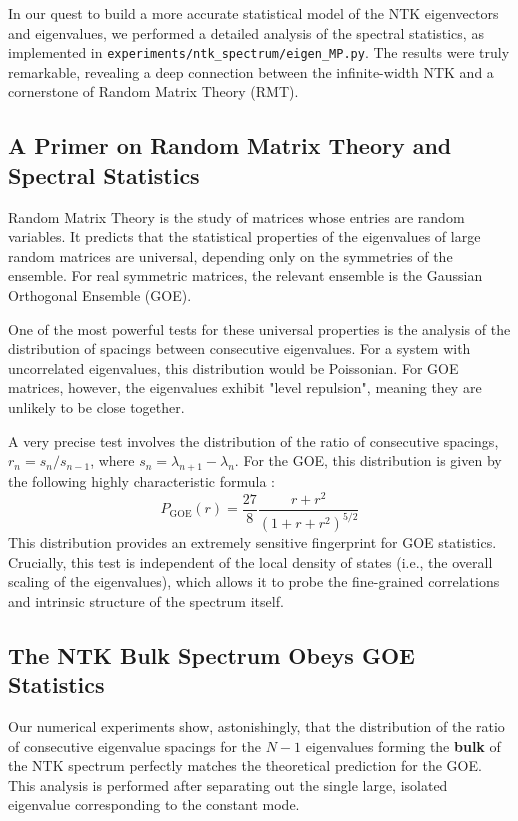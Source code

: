 \documentclass{article}
\begin{document}
In our quest to build a more accurate statistical model of the NTK eigenvectors and eigenvalues, we performed a detailed analysis of the spectral statistics, as implemented in \verb|experiments/ntk_spectrum/eigen_MP.py|. The results were truly remarkable, revealing a deep connection between the infinite-width NTK and a cornerstone of Random Matrix Theory (RMT).

\subsection{A Primer on Random Matrix Theory and Spectral Statistics}
Random Matrix Theory is the study of matrices whose entries are random variables. It predicts that the statistical properties of the eigenvalues of large random matrices are universal, depending only on the symmetries of the ensemble. For real symmetric matrices, the relevant ensemble is the Gaussian Orthogonal Ensemble (GOE).

One of the most powerful tests for these universal properties is the analysis of the distribution of spacings between consecutive eigenvalues. For a system with uncorrelated eigenvalues, this distribution would be Poissonian. For GOE matrices, however, the eigenvalues exhibit "level repulsion", meaning they are unlikely to be close together.

A very precise test involves the distribution of the ratio of consecutive spacings, $r_n = s_n / s_{n-1}$, where $s_n = \lambda_{n+1} - \lambda_n$. For the GOE, this distribution is given by the following highly characteristic formula \cite{atas2013distribution}:
\begin{equation}
P_{\text{GOE}}(r) = \frac{27}{8} \frac{r + r^2}{(1 + r + r^2)^{5/2}}
\label{eq:goe_ratio_dist}
\end{equation}
This distribution provides an extremely sensitive fingerprint for GOE statistics. Crucially, this test is independent of the local density of states (i.e., the overall scaling of the eigenvalues), which allows it to probe the fine-grained correlations and intrinsic structure of the spectrum itself.

\subsection{The NTK Bulk Spectrum Obeys GOE Statistics}
Our numerical experiments show, astonishingly, that the distribution of the ratio of consecutive eigenvalue spacings for the $N-1$ eigenvalues forming the \textbf{bulk} of the NTK spectrum perfectly matches the theoretical prediction for the GOE. This analysis is performed after separating out the single large, isolated eigenvalue corresponding to the constant mode.
\end{document}
